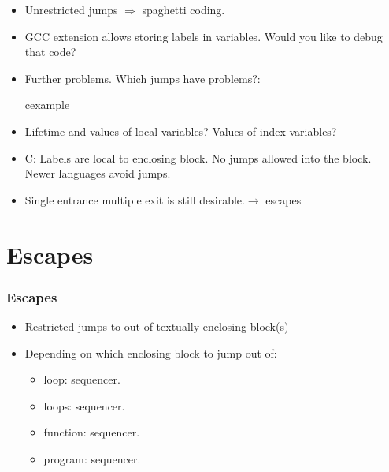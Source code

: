 \begin{frame}
\small
\begin{itemize}
\item Unrestricted jumps $\Rightarrow$ spaghetti coding.
\item GCC extension allows storing labels in variables. Would you like to debug that code? \smiley
\item Further problems. Which jumps have problems?:
\begin{beamercolorbox}{cexample}
\codejumpblock
\end{beamercolorbox}
\item Lifetime and values of local variables? Values of index variables?
\item C: Labels are local to enclosing block. No jumps allowed into the block.
Newer languages avoid jumps.
\item Single entrance multiple exit is still desirable.$\rightarrow$ escapes
\end{itemize}
\end{frame}

\section{Escapes}
\begin{frame}
\frametitle{Escapes}
\begin{itemize}
\item  Restricted jumps to out of textually enclosing block(s)
\item Depending on which enclosing block to jump out of:
\begin{itemize}
\item loop:  sequencer.
\item loops:  sequencer.
\item function:  sequencer.
\item program:  sequencer.
\end{itemize}
\end{itemize}
\end{frame}

